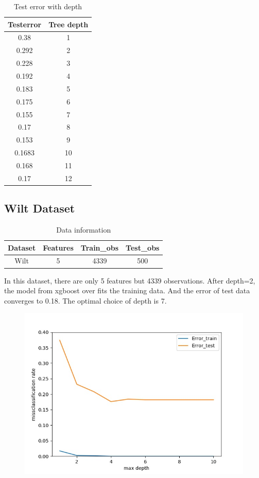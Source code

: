 \documentclass[a4paper]{article}
\begin{document}
\begin{table}[H]
\centering
\caption{Test error with depth}
\begin{tabular}{|c|c|}
	\hline
	Testerror & Tree depth \\
	\hline
	0.38 & 1\\
	\hline
	0.292 &2\\
	\hline
	0.228 &3\\
	\hline
     0.192 &4\\
     \hline
     0.183 & 5\\
     \hline
     0.175& 6\\
     \hline
     0.155& 7\\
     \hline
     0.17 & 8\\
     \hline
     0.153 & 9\\
     \hline
     0.1683 & 10\\
     \hline
     0.168 & 11\\
     \hline
     0.17 & 12 \\
	\hline
\end{tabular}
\end{table}

\subsection{Wilt Dataset}
\begin{table}[H]
\centering
\caption{Data information}
\begin{tabular}{|c|c|c|c|}
	\hline
	Dataset & Features &\textbf{Train\_obs} & \textbf{Test\_obs}\\
	\hline
    Wilt & 5 & 4339 & 500\\
	\hline
\end{tabular}
\end{table}
In this dataset, there are only 5 features but 4339 observations. After depth=2, the model from xgboost over fits the training data. And the error of test data converges to 0.18. The optimal choice of depth is 7.
\begin{figure}[h]
\includegraphics[width=\textwidth]{wilt_result.jpeg}
\caption{}
\label{fig3}
\end{figure}
\end{document}

